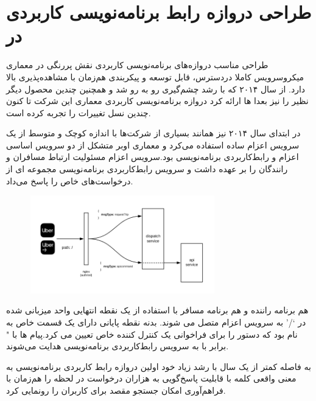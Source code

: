 \section{طراحی دروازه رابط برنامه‌نویسی کاربردی در } 
طراحی مناسب دروازه‌های برنامه‌نویسی کاربردی نقش پررنگی در معماری میکروسرویس کاملا دردسترس، قابل توسعه و پیکربندی هم‌زمان با مشاهده‌پذیری بالا دارد. از سال ۲۰۱۴ که  با رشد چشم‌گیری رو به رو شد و همچنین چندین محصول دیگر نظیر  را نیز بعدا ها ارائه کرد دروازه برنامه‌نویسی کاربردی معماری این شرکت تا کنون چندین نسل تغییرات را تجربه کرده است. \cite{APIGateway}

در ابتدای سال ۲۰۱۴  نیز همانند بسیاری از شرکت‌ها با اندازه کوچک و متوسط از یک سرویس اعزام ساده استفاده می‌کرد و معماری اوبر متشکل از دو سرویس اساسی اعزام و رابط‌کاربردی برنامه‌نویسی  بود.سرویس اعزام مسئولیت ارتباط مسافران و رانندگان را بر عهده داشت و سرویس رابط‌کاربردی برنامه‌نویسی مجموعه ای از درخواست‌های خاص را پاسخ می‌داد.


\begin{figure}[h]
\label{fig:apigateway_gen1}
\centering
\includegraphics[width=8cm]{gen1_apigateway.png}
\end{figure}

هم برنامه راننده و هم برنامه مسافر با استفاده از یک نقطه انتهایی واحد میزبانی شده در ‘/’ به سرویس اعزام متصل می شوند. بدنه نقطه پایانی دارای یک قسمت خاص به نام  بود که دستور  را برای فراخوانی یک کنترل کننده خاص تعیین می کرد.پیام ها با " برابر با  به سرویس رابط‌کاربردی برنامه‌نویسی هدایت می‌شوند.

به فاصله کمتر از یک سال  با رشد زیاد خود اولین دروازه رابط کاربردی برنامه‌نویسی به معنی واقعی کلمه با قابلیت پاسخ‌گویی به هزاران درخواست در لحظه را هم‌زمان با فراهم‌آوری امکان جستجو مقصد برای کاربران را رونمایی کرد.

